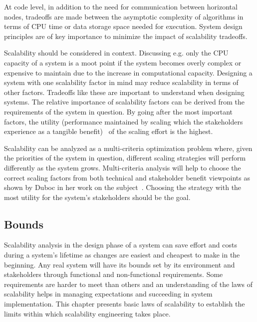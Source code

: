 \documentclass[english]{tktltiki2}
\theoremstyle{definition}
\theoremstyle{remark}
\begin{document}
At code level, in addition to the need for communication between horizontal
nodes, tradeoffs are made between the asymptotic complexity of algorithms in
terms of CPU time or data storage space needed for execution. System design
principles are of key importance to minimize the impact of scalability
tradeoffs.

Scalability should be considered in context. Discussing e.g. only the CPU
capacity of a system is a moot point if the system becomes overly complex or
expensive to maintain due to the increase in computational capacity. Designing a
system with one scalability factor in mind may reduce scalability in terms of
other factors. Tradeoffs like these are important to understand when designing
systems. The relative importance of scalability factors can be derived from the
requirements of the system in question. By going after the most important
factors, the utility (performance maintained by scaling which the stakeholders
experience as a tangible benefit)~\cite{Duboc2007} of the scaling effort is
the highest.

Scalability can be analyzed as a multi-criteria optimization problem where, given
the priorities of the system in question, different scaling strategies will
perform differently as the system grows. Multi-criteria analysis will help to
choose the correct scaling factors from both technical and stakeholder benefit
viewpoints as shown by Duboc in her work on the subject~\cite{Duboc2007}.
Choosing the strategy with the most utility for the system’s stakeholders should
be the goal.

\subsection{Bounds}
\label{sec:scalabilityBounds}


Scalability analysis in the design phase of a system can save effort and costs
during a system’s lifetime as changes are easiest and cheapest to make in the
beginning. Any real system will have its bounds set by its environment and
stakeholders through functional and non-functional requirements. Some
requirements are harder to meet than others and an understanding of the laws of
scalability helps in managing expectations and succeeding in system
implementation. This chapter presents basic laws of scalability to establish the
limits within which scalability engineering takes place.
\end{document}
